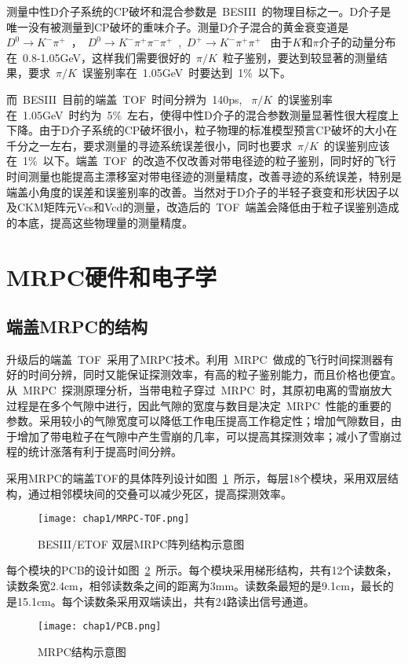 测量中性D介子系统的CP破坏和混合参数是~BESIII~的物理目标之一。D介子是唯一没有被测量到CP破坏的重味介子。测量D介子混合的黄金衰变道是~$D^0 \to K^- \pi^+$~，~$D^0 \to K^- \pi^+\pi^-\pi^+$~,~$D^+ \to K^- \pi^+\pi^+$~
由于$K$和$\pi$介子的动量分布在~0.8-1.05GeV，这样我们需要很好的~$\pi/K$~粒子鉴别，要达到较显著的测量结果，要求~$\pi/K$~误鉴别率在~1.05GeV~时要达到~1$\%$~以下。

而~BESIII~目前的端盖~TOF~时间分辨为~140ps, ~$\pi/K$~的误鉴别率在~1.05GeV~时约为~5$\%$~左右，使得中性D介子的混合参数测量显著性很大程度上下降。由于D介子系统的CP破坏很小，粒子物理的标准模型预言CP破坏的大小在千分之一左右，要求测量的寻迹系统误差很小，同时也要求~$\pi/K$~的误鉴别应该在~1$\%$~以下。端盖~TOF~的改造不仅改善对带电径迹的粒子鉴别，同时好的飞行时间测量也能提高主漂移室对带电径迹的测量精度，改善寻迹的系统误差，特别是端盖小角度的误差和误鉴别率的改善。当然对于D介子的半轻子衰变和形状因子以及CKM矩阵元Vcs和Vcd的测量，改造后的~TOF~端盖会降低由于粒子误鉴别造成的本底，提高这些物理量的测量精度。 

\section{MRPC硬件和电子学}
\subsection{端盖MRPC的结构}
升级后的端盖~TOF~采用了MRPC技术。利用~MRPC~做成的飞行时间探测器有好的时间分辨，同时又能保证探测效率，有高的粒子鉴别能力，而且价格也便宜。从~MRPC~探测原理分析，当带电粒子穿过~MRPC~时，其原初电离的雪崩放大过程是在多个气隙中进行，因此气隙的宽度与数目是决定~MRPC~性能的重要的参数。采用较小的气隙宽度可以降低工作电压提高工作稳定性；增加气隙数目，由于增加了带电粒子在气隙中产生雪崩的几率，可以提高其探测效率；减小了雪崩过程的统计涨落有利于提高时间分辨。

采用MRPC的端盖TOF的具体阵列设计如图~\ref{fig:MRPC-TOF}~所示，每层18个模块，采用双层结构，通过相邻模块间的交叠可以减少死区，提高探测效率。
\begin{figure}[!h]
  \centering
  \texttt{[image: chap1/MRPC-TOF.png]}
  \caption{BESIII/ETOF 双层MRPC阵列结构示意图}
  \label{fig:MRPC-TOF}
\end{figure}

每个模块的PCB的设计如图~\ref{fig:PCB}~所示。每个模块采用梯形结构，共有12个读数条，读数条宽2.4cm，相邻读数条之间的距离为3mm。读数条最短的是9.1cm，最长的是15.1cm。每个读数条采用双端读出，共有24路读出信号通道。

\begin{figure}[!h]
  \centering
  \texttt{[image: chap1/PCB.png]}
  \caption{MRPC结构示意图}
  \label{fig:PCB}
\end{figure}

